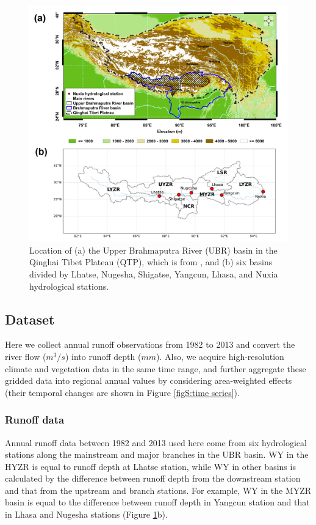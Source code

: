 \documentclass[hess, manuscript]{copernicus}
\begin{document}
\begin{figure}[ht]
    \includegraphics[width=12cm]{02-figures/Figure1.png}
    \caption{Location of (a) the Upper Brahmaputra River (UBR) basin in the Qinghai Tibet Plateau (QTP), which is from \citet{li2021vegetation}, and (b) six basins divided by Lhatse, Nugesha, Shigatse, Yangcun, Lhasa, and Nuxia hydrological stations.}
    \label{fig:location}
\end{figure}

\subsection{Dataset}
Here we collect annual runoff observations from 1982 to 2013 and convert the river flow ($m^{3}/s$) into runoff depth ($mm$). Also, we acquire high-resolution climate and vegetation data in the same time range, and further aggregate these gridded data into regional annual values by considering area-weighted effects (their temporal changes are shown in Figure \ref{figS:time series}).

\subsubsection{Runoff data}
Annual runoff data between 1982 and 2013 used here come from six hydrological stations along the mainstream and major branches in the UBR basin.
WY in the HYZR is equal to runoff depth at Lhatse station, while WY in other basins is calculated by the difference between runoff depth from the downstream station and that from the upstream and branch stations. 
For example, WY in the MYZR basin is equal to the difference between runoff depth in Yangcun station and that in Lhasa and Nugesha stations (Figure \ref{fig:location}b).
\end{document}

